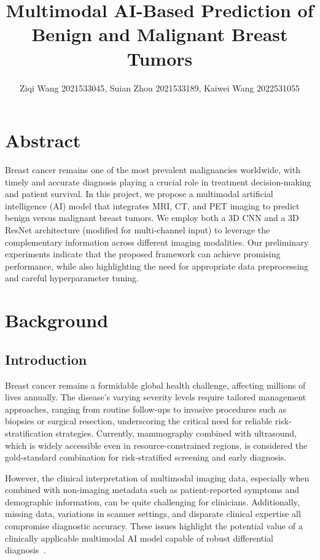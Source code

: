 \documentclass{article}
\title{Multimodal AI-Based Prediction of Benign and Malignant Breast Tumors}
\author{Ziqi Wang 2021533045, Suian Zhou 2021533189, Kaiwei Wang 2022531055}
\begin{document}
\maketitle

\section{Abstract}
Breast cancer remains one of the most prevalent malignancies worldwide, with timely and accurate diagnosis playing a crucial role in treatment decision-making and patient survival. In this project, we propose a multimodal artificial intelligence (AI) model that integrates MRI, CT, and PET imaging to predict benign versus malignant breast tumors. We employ both a 3D CNN and a 3D ResNet architecture (modified for multi-channel input) to leverage the complementary information across different imaging modalities. Our preliminary experiments indicate that the proposed framework can achieve promising performance, while also highlighting the need for appropriate data preprocessing and careful hyperparameter tuning. 

\section{Background}
\subsection{Introduction}
Breast cancer remains a formidable global health challenge, affecting millions of lives annually. The disease’s varying severity levels require tailored management approaches, ranging from routine follow-ups to invasive procedures such as biopsies or surgical resection, underscoring the critical need for reliable risk-stratification strategies. Currently, mammography combined with ultrasound, which is widely accessible even in resource-constrained regions, is considered the gold-standard combination for risk-stratified screening and early diagnosis. 

However, the clinical interpretation of multimodal imaging data, especially when combined with non-imaging metadata such as patient-reported symptoms and demographic information, can be quite challenging for clinicians. Additionally, missing data, variations in scanner settings, and disparate clinical expertise all compromise diagnostic accuracy. These issues highlight the potential value of a clinically applicable multimodal AI model capable of robust differential diagnosis~\cite{BMU}.
\end{document}
